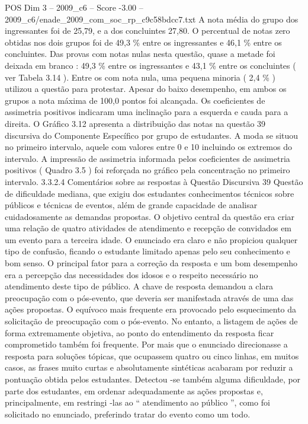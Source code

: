 \begin{textsample}{POS Dim 3 – 2009\_c6 – Score -3.00 – 2009\_c6/enade\_2009\_com\_soc\_rp\_c9c58bdcc7.txt}
A nota média do grupo dos ingressantes foi de 25,79, e a dos concluintes 27,80.
O percentual de notas zero obtidas nos dois grupos foi de 49,3 \% entre os ingressantes e 46,1 \% entre os concluintes.
Das provas com notas nulas nesta questão, quase a metade foi deixada em branco : 49,3 \% entre os ingressantes e 43,1 \% entre os concluintes ( ver Tabela 3.14 ).
Entre os com nota nula, uma pequena minoria ( 2,4 \% ) utilizou a questão para protestar.
Apesar do baixo desempenho, em ambos os grupos a nota máxima de 100,0 pontos foi alcançada.
Os coeficientes de assimetria positivos indicaram uma inclinação para a esquerda e cauda para a direita.
O Gráfico 3.12 apresenta a distribuição das notas na questão 39 discursiva do Componente Específico por grupo de estudantes.
A moda se situou no primeiro intervalo, aquele com valores entre 0 e 10 incluindo os extremos do intervalo.
A impressão de assimetria informada pelos coeficientes de assimetria positivos ( Quadro 3.5 ) foi reforçada no gráfico pela concentração no primeiro intervalo. 3.3.2.4 Comentários sobre as respostas à Questão Discursiva 39 Questão de dificuldade mediana, que exigiu dos estudantes conhecimentos técnicos sobre públicos e técnicas de eventos, além de grande capacidade de analisar cuidadosamente as demandas propostas.
O objetivo central da questão era criar uma relação de quatro atividades de atendimento e recepção de convidados em um evento para a terceira idade.
O enunciado era claro e não propiciou qualquer tipo de confusão, ficando o estudante limitado apenas pelo seu conhecimento e bom senso.
O principal fator para a correção da resposta e um bom desempenho era a percepção das necessidades dos idosos e o respeito necessário no atendimento deste tipo de público.
A chave de resposta demandou a clara preocupação com o pós-evento, que deveria ser manifestada através de uma das ações propostas.
O equívoco mais frequente era provocado pelo esquecimento da solicitação de preocupação com o pós-evento.
No entanto, a listagem de ações de forma extremamente objetiva, ao ponto do entendimento da resposta ficar comprometido também foi frequente.
Por mais que o enunciado direcionasse a resposta para soluções tópicas, que ocupassem quatro ou cinco linhas, em muitos casos, as frases muito curtas e absolutamente sintéticas acabaram por reduzir a pontuação obtida pelos estudantes.
Detectou -se também alguma dificuldade, por parte dos estudantes, em ordenar adequadamente as ações propostas e, principalmente, em restringi -las ao “ atendimento ao público ”, como foi solicitado no enunciado, preferindo tratar do evento como um todo.

\end{textsample}
